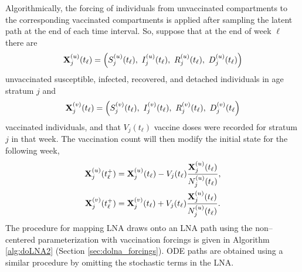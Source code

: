 Algorithmically, the forcing of individuals from unvaccinated compartments to the corresponding vaccinated compartments is applied after sampling the latent path at the end of each time interval. So, suppose that at the end of week $ \ell $ there are $$ \bX_j^{(u)}(t_\ell) = \left (S_j^{(u)}(t_\ell),\ I_j^{(u)}(t_\ell),\ R_j^{(u)}(t_\ell),\ D_j^{(u)}(t_\ell)\right ) $$ unvaccinated susceptible, infected, recovered, and detached individuals in age stratum $ j $ and $$ \bX_j^{(v)}(t_\ell) = \left (S_j^{(v)}(t_\ell),\ I_j^{(v)}(t_\ell),\ R_j^{(v)}(t_\ell),\ D_j^{(v)}(t_\ell\right ) $$ vaccinated individuals, and that $ V_j(t_\ell) $ vaccine doses were recorded for stratum $ j $ in that week. The vaccination count will then modify the initial state for the following week,
\begin{align}
\label{eqn:vacc_forcing}
\begin{split}
	\mathbf{X}_{j}^{(u)}(t_\ell^+) &= \mathbf{X}_j^{(u)}(t_\ell) - V_j(t_\ell)\frac{\mathbf{X}_{j}^{(u)}(t_\ell)}{N_{j}^{(u)}(t_\ell)}, \\
	\mathbf{X}_{j}^{(v)}(t_\ell^+) &= \mathbf{X}_j^{(v)}(t_\ell) + V_j(t_\ell)\frac{\mathbf{X}_{j}^{(u)}(t_\ell)}{N_{j}^{(u)}(t_\ell)}.
\end{split}
\end{align}
The procedure for mapping LNA draws onto an LNA path using the non--centered parameterization with vaccination forcings is given in Algorithm \ref{alg:doLNA2} (Section \ref{sec:dolna_forcings}). ODE paths are obtained using a similar procedure by omitting the stochastic terms in the LNA. 


